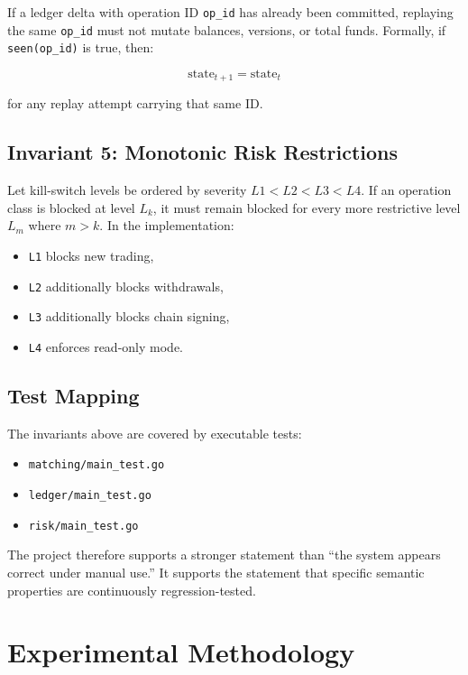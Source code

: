 \documentclass[11pt]{article}
\begin{document}
If a ledger delta with operation ID \texttt{op\_id} has already been committed, replaying the same \texttt{op\_id} must not mutate balances, versions, or total funds. Formally, if \texttt{seen(op\_id)} is true, then:

\[
\mathrm{state}_{t+1} = \mathrm{state}_{t}
\]

for any replay attempt carrying that same ID.

\subsection{Invariant 5: Monotonic Risk Restrictions}

Let kill-switch levels be ordered by severity \(L1 < L2 < L3 < L4\). If an operation class is blocked at level \(L_k\), it must remain blocked for every more restrictive level \(L_m\) where \(m > k\). In the implementation:

\begin{itemize}[leftmargin=1.5em]
  \item \texttt{L1} blocks new trading,
  \item \texttt{L2} additionally blocks withdrawals,
  \item \texttt{L3} additionally blocks chain signing,
  \item \texttt{L4} enforces read-only mode.
\end{itemize}

\subsection{Test Mapping}

The invariants above are covered by executable tests:

\begin{itemize}[leftmargin=1.5em]
  \item \texttt{matching/main\_test.go}
  \item \texttt{ledger/main\_test.go}
  \item \texttt{risk/main\_test.go}
\end{itemize}

The project therefore supports a stronger statement than ``the system appears correct under manual use.'' It supports the statement that specific semantic properties are continuously regression-tested.

\section{Experimental Methodology}
\end{document}
